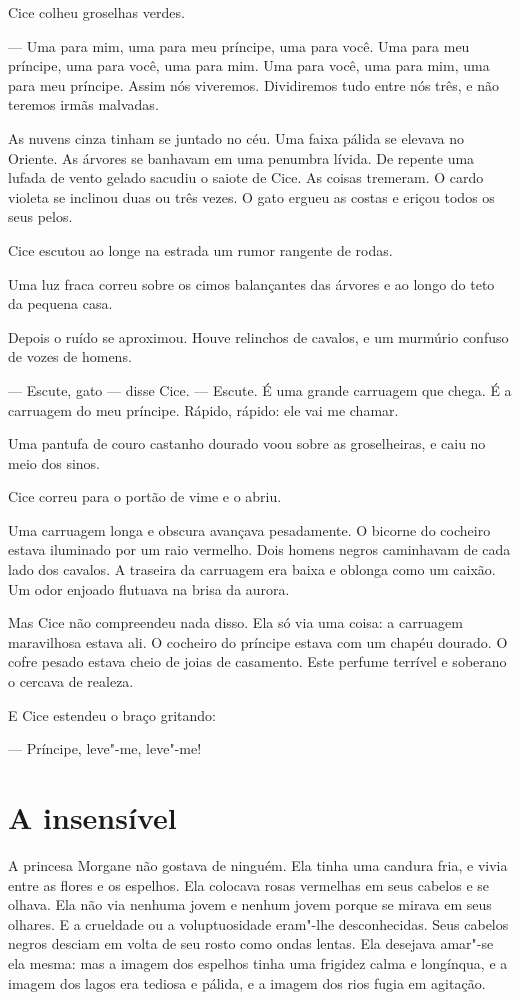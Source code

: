 Cice colheu groselhas verdes.

--- Uma para mim, uma para meu príncipe, uma para você. Uma para meu
príncipe, uma para você, uma para mim. Uma para você, uma para mim, uma
para meu príncipe. Assim nós viveremos. Dividiremos tudo entre nós três, e
não teremos irmãs malvadas.


As nuvens cinza tinham se juntado no céu. Uma faixa pálida se elevava
no Oriente. As árvores se banhavam em uma penumbra lívida. De repente uma
lufada de vento gelado sacudiu o saiote de Cice. As coisas tremeram. O
cardo violeta se inclinou duas ou três vezes. O gato ergueu as costas e
eriçou todos os seus pelos.

Cice escutou ao longe na estrada um rumor rangente de rodas.

Uma luz fraca correu sobre os cimos balançantes das árvores e ao longo
do teto da pequena casa.

Depois o ruído se aproximou. Houve relinchos de cavalos, e um murmúrio
confuso de vozes de homens.

--- Escute, gato --- disse Cice.  --- Escute. É uma grande carruagem que chega.
É a carruagem do meu príncipe. Rápido, rápido: ele vai me chamar.

Uma pantufa de couro castanho dourado voou sobre as groselheiras, e
caiu no meio dos sinos.

Cice correu para o portão de vime e o abriu.

Uma carruagem longa e obscura avançava pesadamente. O bicorne do
cocheiro estava iluminado por um raio vermelho. Dois homens negros caminhavam
de cada lado dos cavalos. A traseira da carruagem era baixa e oblonga como
um caixão. Um odor enjoado flutuava na brisa da aurora.

Mas Cice não compreendeu nada disso. Ela só via uma coisa: a carruagem
maravilhosa estava ali. O cocheiro do príncipe estava com um chapéu
dourado. O cofre pesado estava cheio de joias de casamento. Este perfume
terrível e soberano o cercava de realeza.

E Cice estendeu o braço gritando:

--- Príncipe, leve"-me, leve"-me!

\section*{A insensível}

A princesa Morgane não gostava de ninguém. Ela tinha uma candura fria,
e vivia entre as flores e os espelhos. Ela colocava rosas vermelhas em
seus cabelos e se olhava. Ela não via nenhuma jovem e nenhum jovem porque
se mirava em seus olhares. E a crueldade ou a voluptuosidade eram"-lhe
desconhecidas. Seus cabelos negros desciam em volta de seu rosto como
ondas lentas. Ela desejava amar"-se ela mesma: mas a imagem dos espelhos
tinha uma frigidez calma e longínqua, e a imagem dos lagos era tediosa e
pálida, e a imagem dos rios fugia em agitação.

